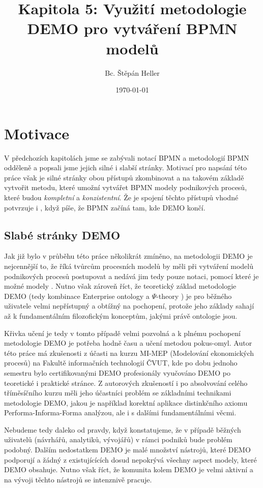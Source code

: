 \documentclass[]{article}
\newcommand{\ptheory}{$\Psi$-theory }
\begin{document}
\title{Kapitola 5: Využití metodologie DEMO pro vytváření BPMN modelů}
\author{Bc. Štěpán Heller}
\date{\today}
\maketitle

\section{Motivace} \label{sec:motivace}
V předchozích kapitolách jsme se zabývali notací BPMN a metodologií BPMN odděleně a popsali jsme jejich silné i slabší stránky. Motivací pro napsání této práce však je silné stránky obou přístupů zkombinovat a na takovém základě vytvořit metodu, které umožní vytvářet BPMN modely podnikových procesů, které budou \textit{kompletní} a \textit{konzistentní}. Že je spojení těchto přístupů vhodné potvrzuje i \cite{VanNuffel2009}, když píše, že BPMN začíná tam, kde DEMO končí.

\subsection{Slabé stránky DEMO}
Jak již bylo v průběhu této práce několikrát zmíněno, na metodologii DEMO je nejcennější to, že říká tvůrcům procesních modelů  by měli při vytváření modelů podnikových procesů postupovat a nedává jim tedy pouze notaci, pomocí které je možné modely . Nutno však zároveň říct, že teoretický základ metodologie DEMO (tedy kombinace Enterprise ontology a \ptheory) je pro běžného uživatele velmi nepřístupný a obtížný na pochopení, protože jeho základy sahají až k fundamentálním filozofickým konceptům, jakými právě ontologie jsou. 

Křivka učení je tedy v tomto případě velmi pozvolná a k plnému pochopení metodologie DEMO je potřeba hodně času a učení metodou pokus-omyl. Autor této práce má zkušenosti z účasti na kurzu MI-MEP (Modelování ekonomických procesů) na Fakultě informačních technologií ČVUT, kde po dobu jednoho semestru bylo certifikovanými DEMO profesionály vyučováno DEMO po teoretické i praktické stránce. Z autorových zkušeností i po absolvování celého tříměsíčního kurzu měli jeho účastníci problém se základními technikami metodologie DEMO, jakou je například korektní aplikace distinkčního axiomu Performa-Informa-Forma analýzou, ale i s dalšími fundamentálními věcmi.

Nebudeme tedy daleko od pravdy, když konstatujeme, že v případě běžných uživatelů (návrhářů, analytiků, vývojářů) v rámci podniků bude problém podobný. Dalším nedostatkem DEMO je malé množství nástrojů, které DEMO podporují a žádný z existujícících dosud nepokrývá všechny aspect modely, které DEMO obsahuje. Nutno však říct, že komunita kolem DEMO je velmi aktivní a na vývoji těchto nástrojů se intenznivě pracuje.
\end{document}
